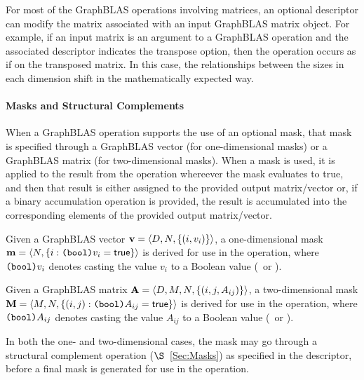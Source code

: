 For most of the GraphBLAS operations involving matrices, an optional descriptor 
can modify the matrix associated with an input GraphBLAS matrix object.  For 
example, if an input matrix is an argument to a GraphBLAS operation and the 
associated descriptor indicates the transpose option, then the operation occurs 
as if on the transposed matrix.  In this case, the relationships between the 
sizes in each dimension shift in the mathematically expected way. 

\paragraph{Masks and Structural Complements}

%
%

When a GraphBLAS operation supports the use of an optional mask, that mask is
specified through a GraphBLAS vector (for one-dimensional masks) or
a GraphBLAS matrix (for two-dimensional masks).  When a mask is used, it is 
applied to the result from the operation whereever the mask evaluates to true, 
and then that result is either assigned 
to the provided output matrix/vector or, if a binary accumulation operation is 
provided, the result is accumulated into the corresponding elements of the provided 
output matrix/vector.

Given a GraphBLAS vector ${\bf v} = \langle D,N, \{ (i,v_i) \} \rangle$, a
one-dimensional mask ${\bf m} = \langle N, \{ i : \mbox{\tt (bool)}v_i = {\sf true} \} \rangle$
is derived for use in the operation, where $\mbox{\tt (bool)}v_i$ denotes
casting the value $v_i$ to a Boolean value (\true\ or \false).


Given a GraphBLAS matrix ${\bf A} = \langle D, M, N, \{ (i,j,A_{ij}) \} \rangle$,
a two-dimensional mask ${\bf M} = \langle M,N, \{ (i,j) : \mbox{\tt (bool)}A_{ij} = {\sf true} \} \rangle$
is derived for use in the operation, where $\mbox{\tt (bool)}A_{ij}$ denotes
casting the value $A_{ij}$ to a Boolean value (\true\ or \false).

In both the one- and two-dimensional cases, the mask may go through a structural
complement operation ($\S$~\ref{Sec:Masks}) as specified in the descriptor, before 
a final mask is generated for use in the operation.

